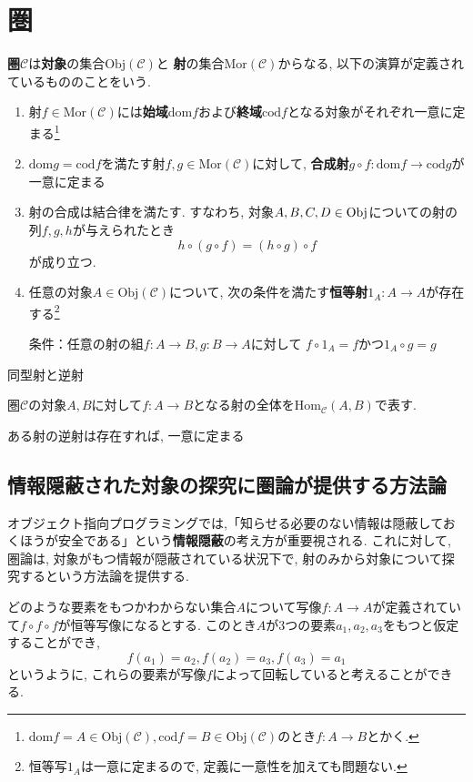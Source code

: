 \documentclass{jsbook}
\theoremstyle{plain}
\begin{document}
\section{圏}
\begin{Def}
{\bf 圏}$\mathscr{C}$は{\bf 対象}の集合$\mathrm{Obj}(\mathscr{C})$と
{\bf 射}の集合$\mathrm{Mor}(\mathscr{C})$からなる, 以下の演算が定義されているもののことをいう.
\begin{enumerate}
\item 射$f\in\mathrm{Mor}(\mathscr{C})$には{\bf 始域}$\mathrm{dom}f$および{\bf 終域}$\mathrm{cod}f$となる対象がそれぞれ一意に定まる\footnote{$\mathrm{dom}f=A\in\mathrm{Obj}(\mathscr{C}),\mathrm{cod}f=B\in\mathrm{Obj}(\mathscr{C})$のとき$f:A\rightarrow B$とかく.}
\item $\mathrm{dom} g=\mathrm{cod}f$を満たす射$f,g\in\mathrm{Mor}(\mathscr{C})$に対して,
{\bf 合成射}$g\circ f:\mathrm{dom}f\rightarrow\mathrm{cod}g$が一意に定まる
\item 射の合成は結合律を満たす. すなわち, 対象$A,B,C,D\in\rm{Obj}$についての射の列$f,g,h$が与えられたとき
\[
h\circ(g\circ f)=(h\circ g)\circ f
\]
が成り立つ.
\item 任意の対象$A\in\mathrm{Obj}(\mathscr{C})$について,
次の条件を満たす{\bf 恒等射}$1_{A}:A\rightarrow A$が存在する\footnote{恒等写$1_{A}$は一意に定まるので, 定義に一意性を加えても問題ない.}

条件：任意の射の組$f:A\rightarrow B, g:B\rightarrow A$に対して
$f\circ 1_A=f$かつ$1_A\circ g=g$
\end{enumerate}
\end{Def}
\begin{Def}
同型射と逆射
\end{Def}
\begin{Notation}
圏$\mathscr{C}$の対象$A,B$に対して$f:A\rightarrow B$となる射の全体を$\mathrm{Hom}_{\mathscr{C}}(A,B)$で表す.
\end{Notation}
\begin{Prop}
ある射の逆射は存在すれば, 一意に定まる
\end{Prop}
\subsection{情報隠蔽された対象の探究に圏論が提供する方法論}
オブジェクト指向プログラミングでは,「知らせる必要のない情報は隠蔽しておくほうが安全である」という{\bf 情報隠蔽}の考え方が重要視される.
これに対して, 圏論は, 対象がもつ情報が隠蔽されている状況下で, 射のみから対象について探究するという方法論を提供する.
\begin{example}
どのような要素をもつかわからない集合$A$について写像$f:A\rightarrow A$が定義されていて$f\circ f\circ f$が恒等写像になるとする.
このとき$A$が3つの要素$a_1,a_2,a_3$をもつと仮定することができ,
\[
f(a_1)=a_2, f(a_2)=a_3, 
f(a_3)=a_1
\]
というように, これらの要素が写像$f$によって回転していると考えることができる.
\end{example}
\end{document}
